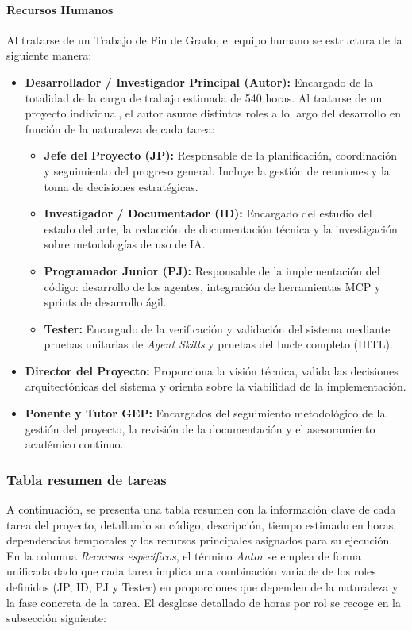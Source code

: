 \documentclass[11pt, letterpaper]{article}
\begin{document}
\paragraph{Recursos Humanos}
\label{sec:recursos_humanos}
Al tratarse de un Trabajo de Fin de Grado, el equipo humano se estructura de la siguiente manera:
\begin{itemize}
    \item \textbf{Desarrollador / Investigador Principal (Autor):} Encargado de la totalidad de la carga de trabajo estimada de 540 horas. Al tratarse de un proyecto individual, el autor asume distintos roles a lo largo del desarrollo en función de la naturaleza de cada tarea:
    \begin{itemize}
        \item \textbf{Jefe del Proyecto (JP):} Responsable de la planificación, coordinación y seguimiento del progreso general. Incluye la gestión de reuniones y la toma de decisiones estratégicas.
        \item \textbf{Investigador / Documentador (ID):} Encargado del estudio del estado del arte, la redacción de documentación técnica y la investigación sobre metodologías de uso de IA.
        \item \textbf{Programador Junior (PJ):} Responsable de la implementación del código: desarrollo de los agentes, integración de herramientas MCP y sprints de desarrollo ágil.
        \item \textbf{Tester:} Encargado de la verificación y validación del sistema mediante pruebas unitarias de \textit{Agent Skills} y pruebas del bucle completo (HITL).
    \end{itemize}
    \item \textbf{Director del Proyecto:} Proporciona la visión técnica, valida las decisiones arquitectónicas del sistema y orienta sobre la viabilidad de la implementación.
    \item \textbf{Ponente y Tutor GEP:} Encargados del seguimiento metodológico de la gestión del proyecto, la revisión de la documentación y el asesoramiento académico continuo.
\end{itemize}

\subsubsection{Tabla resumen de tareas}
\label{sec:tabla_resumen}
A continuación, se presenta una tabla resumen con la información clave de cada tarea del proyecto, detallando su código, descripción, tiempo estimado en horas, dependencias temporales y los recursos principales asignados para su ejecución. En la columna \textit{Recursos específicos}, el término \textit{Autor} se emplea de forma unificada dado que cada tarea implica una combinación variable de los roles definidos (JP, ID, PJ y Tester) en proporciones que dependen de la naturaleza y la fase concreta de la tarea. El desglose detallado de horas por rol se recoge en la subsección siguiente:
\end{document}
